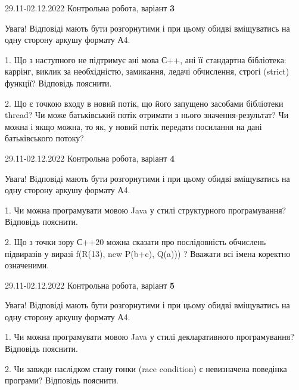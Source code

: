 \documentclass[11pt, ukrainian]{article}
\begin{document}
{29.11-02.12.2022 Контрольна робота, варіант  \No \textbf { 3 }\par}
Увага! Відповіді мають бути розгорнутими і при цьому обидві вміщуватись на одну сторону аркушу формату А4.

{
\begin {large}

1. Що з наступного не підтримує ані мова С++, ані її стандартна бібліотека: каррінг, виклик за необхідністю, замикання, ледачі обчислення, строгі (strict) функції? Відповідь пояснити.%

2. Що є точкою входу в новий потік, що його запущено засобами бібліотеки thread? Чи може батьківський потік отримати з нього значення-результат? Чи можна і якщо можна, то як, у новий потік передати посилання на дані батьківського потоку?

\end {large}}

\vspace{4mm}



{29.11-02.12.2022 Контрольна робота, варіант  \No \textbf { 4 }\par}
Увага! Відповіді мають бути розгорнутими і при цьому обидві вміщуватись на одну сторону аркушу формату А4.

{
\begin {large}

1. Чи можна програмувати мовою Java у стилі структурного програмування? Відповідь пояснити.%

2. Що з точки зору С++20 можна сказати про послідовність обчислень підвиразів у виразі f(R(13), new P(b+c), Q(a))) ? Вважати всі імена коректно означеними.

\end {large}}

\vspace{4mm}
\newpage
{29.11-02.12.2022 Контрольна робота, варіант  \No \textbf { 5 }\par}
Увага! Відповіді мають бути розгорнутими і при цьому обидві вміщуватись на одну сторону аркушу формату А4.

{
\begin {large}

1. Чи можна програмувати мовою Java у стилі декларативного програмування? Відповідь пояснити.%

2. Чи завжди наслідком стану гонки (race condition) є невизначена поведінка програми? Відповідь пояснити.

\end {large}}
\end{document}
